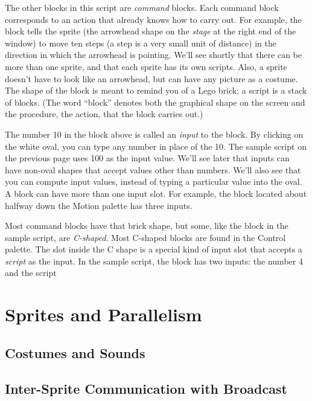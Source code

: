 \documentclass{report}
\begin{document}
The other blocks in this script are \emph{command} blocks. Each command block corresponds to an action that \Snap{} already knows how to carry out. For example, the block  tells the sprite (the arrowhead shape on the \emph{stage} at the right end of the window) to move ten steps (a step is a very small unit of distance) in the direction in which the arrowhead is pointing. We'll see shortly that there can be more than one sprite, and that each sprite has its own scripts. Also, a sprite doesn't have to look like an arrowhead, but can have any picture as a costume. The shape of the  block is meant to remind you of a Lego\texttrademark{} brick; a script is a stack of blocks. (The word ``block'' denotes both the graphical shape on the screen and the procedure, the action, that the block carries out.)

The number 10 in the  block above is called an \emph{input} to the block. By clicking on the white oval, you can type any number in place of the 10. The sample script on the previous page uses 100 as the input value. We'll see later that inputs can have non-oval shapes that accept values other than numbers. We'll also see that you can compute input values, instead of typing a particular value into the oval. A block can have more than one input slot. For example, the  block located about halfway down the Motion palette has three inputs.

Most command blocks have that brick shape, but some, like the  block in the sample script, are \emph{C-shaped}. Most C-shaped blocks are found in the Control palette. The slot inside the C shape is a special kind of input slot that accepts a \emph{script} as the input. In the sample script, the  block has two inputs: the number 4 and the script




\section{Sprites and Parallelism}
\subsection{Costumes and Sounds}
\subsection{Inter-Sprite Communication with Broadcast}
\end{document}
